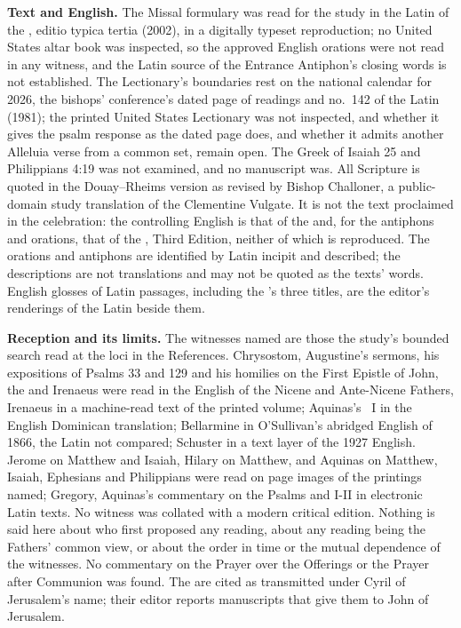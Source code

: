 {\textbf{Text and English.} The Missal formulary was read for the study in the
Latin of the , editio typica tertia (2002), in a
digitally typeset reproduction; no United States altar book was inspected, so
the approved English orations were not read in any witness, and the Latin
source of the Entrance Antiphon's closing words is not established. The
Lectionary's boundaries rest on the national calendar for 2026, the bishops'
conference's dated page of readings and no.~142 of the Latin  (1981); the printed United States Lectionary was not
inspected, and whether it gives the psalm response as the dated page does, and
whether it admits another Alleluia verse from a common set, remain open. The
Greek of Isaiah 25 and Philippians 4:19 was not examined, and no manuscript
was. All Scripture is quoted in the Douay--Rheims version as revised by
Bishop Challoner, a public-domain study translation of the Clementine Vulgate.
It is not the text proclaimed in the celebration: the controlling English is
that of the  and, for the antiphons and orations, that of the
, Third Edition, neither of which is reproduced. The
orations and antiphons are identified by Latin incipit and described; the
descriptions are not translations and may not be quoted as the texts' words.
English glosses of Latin passages, including the 's three titles,
are the editor's renderings of the Latin beside them.

\textbf{Reception and its limits.} The witnesses named are those the study's
bounded search read at the loci in the References. Chrysostom, Augustine's
sermons, his expositions of Psalms 33 and 129 and his homilies on the First
Epistle of John, the  and Irenaeus were read in
the English of the Nicene and Ante-Nicene Fathers, Irenaeus in a machine-read
text of the printed volume; Aquinas's ~I in the English Dominican
translation; Bellarmine in O'Sullivan's abridged English of 1866, the Latin
not compared; Schuster in a text layer of the 1927 English. Jerome on Matthew
and Isaiah, Hilary on Matthew, and Aquinas on Matthew, Isaiah, Ephesians and
Philippians were read on page images of the printings named; Gregory,
Aquinas's commentary on the Psalms and  I-II in electronic Latin
texts. No witness was collated with a modern critical edition. Nothing is
said here about who first proposed any reading, about any reading being the
Fathers' common view, or about the order in time or the mutual dependence of
the witnesses. No commentary on the Prayer over the Offerings or the Prayer
after Communion was found. The  are cited as
transmitted under Cyril of Jerusalem's name; their editor reports manuscripts
that give them to John of Jerusalem.

}
